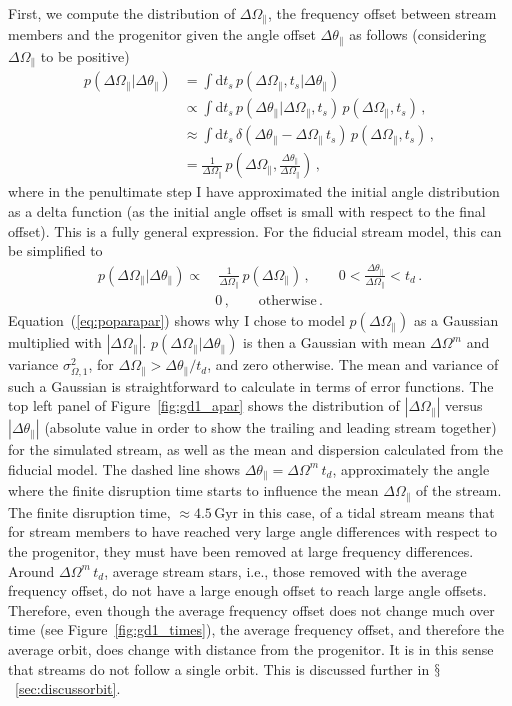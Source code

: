 \documentclass[12pt,preprint]{aastex}
\newcommand{\ie}{i.e.}
\newcommand{\dd}{\mathrm{d}}
\newcommand{\Eqnname}{Equation}
\renewcommand{\figurename}{Figure}
\newcommand{\sectionname}{$\mathsection$}
\newcommand{\Gyr}{\ensuremath{\,\mathrm{Gyr}}}
\newcommand{\apar}{\ensuremath{\theta_\parallel}}
\newcommand{\opar}{\ensuremath{\Omega_\parallel}}
\newcommand{\ts}{\ensuremath{t_s}}
\begin{document}
First, we compute the distribution of $\Delta \opar$, the frequency
offset between stream members and the progenitor given the angle
offset $\Delta \apar$ as follows (considering $\Delta \opar$ to be
positive)
\begin{equation}\label{eq:poparapargeneral}
\begin{split}
  p(\Delta \opar|\Delta \apar) & = \int \dd \ts\,p(\Delta \opar,\ts|\Delta \apar)\, \\
  & \propto \int \dd \ts \,p(\Delta \apar | \Delta \opar,\ts)\,p(\Delta \opar,\ts)\,,\\
  & \approx \int \dd \ts \,\delta(\Delta \apar - \Delta \opar\,\ts)\,p(\Delta \opar,\ts)\,,\\
  & = \frac{1}{\Delta \opar}\,p(\Delta \opar,\frac{\Delta \apar}{\Delta \opar})\,,
\end{split}
\end{equation}
where in the penultimate step I have approximated the initial angle
distribution as a delta function (as the initial angle offset is small
with respect to the final offset). This is a fully general
expression. For the fiducial stream model, this can be simplified to
\begin{equation}\label{eq:poparapar}
\begin{split}
  p(\Delta \opar|\Delta \apar) \propto &\ \frac{1}{\Delta \opar}\,p(\Delta \opar)\,,\qquad 0 < \frac{\Delta \apar}{\Delta \opar} < t_d\,.\\
  & 0\,,\qquad \mathrm{otherwise}\,.
\end{split}
\end{equation}
\Eqnname~(\ref{eq:poparapar}) shows why I chose to model $p(\Delta
\opar)$ as a Gaussian multiplied with $|\Delta \opar|$. $p(\Delta
\opar|\Delta \apar)$ is then a Gaussian with mean $\Delta \Omega^m$
and variance $\sigma^2_{\Omega,1}$, for $\Delta \opar > \Delta \apar /
t_d$, and zero otherwise. The mean and variance of such a Gaussian is
straightforward to calculate in terms of error functions. The top left
panel of \figurename~\ref{fig:gd1_apar} shows the distribution of
$|\Delta \opar|$ versus $|\Delta \apar|$ (absolute value in order to
show the trailing and leading stream together) for the simulated
stream, as well as the mean and dispersion calculated from the
fiducial model. The dashed line shows $\Delta \apar = \Delta \Omega^m
\,t_d$, approximately the angle where the finite disruption time
starts to influence the mean $\Delta \opar$ of the stream. The finite
disruption time, $\approx 4.5\Gyr$ in this case, of a tidal stream
means that for stream members to have reached very large angle
differences with respect to the progenitor, they must have been
removed at large frequency differences. Around $\Delta \Omega^m
\,t_d$, average stream stars, \ie, those removed with the average
frequency offset, do not have a large enough offset to reach large
angle offsets. Therefore, even though the average frequency offset
does not change much over time (see \figurename~\ref{fig:gd1_times}),
the average frequency offset, and therefore the average orbit, does
change with distance from the progenitor. It is in this sense that
streams do not follow a single orbit. This is discussed further in
\sectionname~\ref{sec:discussorbit}.
\end{document}

